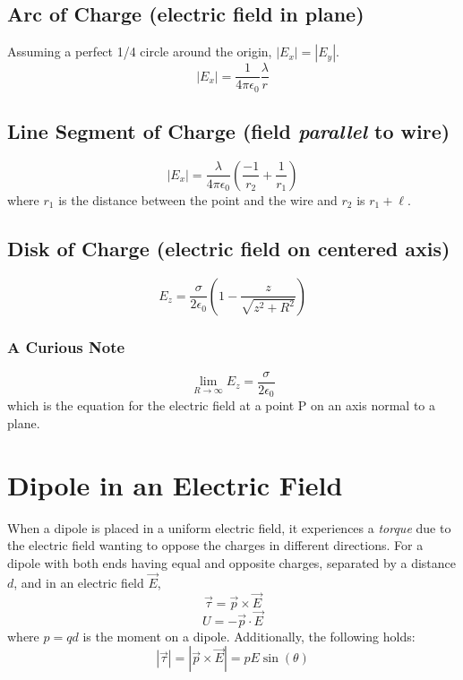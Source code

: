 \documentclass[]{article}
\begin{document}
\subsection{Arc of Charge (electric field in plane)}
Assuming a perfect 1/4 circle around the origin, $ |E_x| = |E_y| $.
\[ |E_x| = \frac{1}{4\pi\epsilon_0} \frac{\lambda}{r} \]
\subsection{Line Segment of Charge (field \emph{parallel} to wire)}
\[ |E_x| = \frac{\lambda}{4\pi\epsilon_0}\left(\frac{-1}{r_2} + \frac{1}{r_1}\right) \]
where $ r_1 $ is the distance between the point and the wire and $ r_2 $ is $ r_1 + \ell $.
\subsection{Disk of Charge (electric field on centered axis)}
\[ E_z = \frac{\sigma}{2\epsilon_0}\left(1 - \frac{z}{\sqrt{z^2 + R^2}}\right) \]
\subsubsection{A Curious Note}
\[ \lim_{R \to \infty} E_z = \frac{\sigma}{2\epsilon_0} \]
which is the equation for the electric field at a point P on an axis normal to a plane.

\section{Dipole in an Electric Field}
When a dipole is placed in a uniform electric field, it experiences a \emph{torque} due to the electric field wanting to oppose the charges in different directions.
For a dipole with both ends having equal and opposite charges, separated by a distance $ d $, and in an electric field $ \vec{E} $,
\[ \vec{\tau} = \vec{p} \times \vec{E} \]
\[ U = -\vec{p} \cdot \vec{E} \]
where $ p = qd $ is the moment on a dipole. Additionally, the following holds:
\[ |\vec{\tau}| = |\vec{p} \times \vec{E}| = pE\sin(\theta) \]
\end{document}
